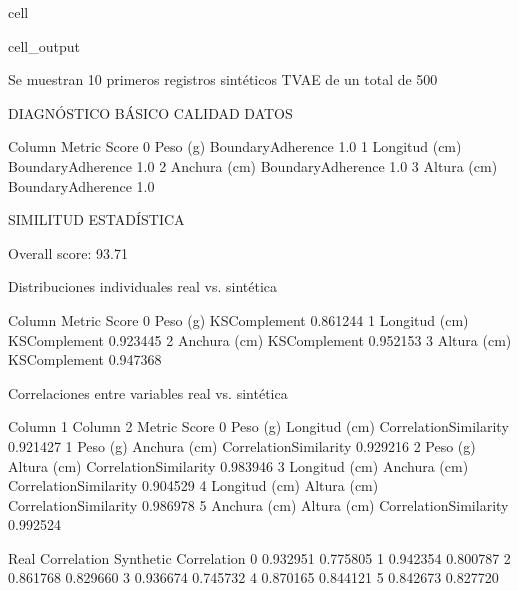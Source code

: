 \documentclass[a4paper,10pt,spanish]{jupyterBook}
\begin{document}
\begin{sphinxuseclass}{cell}
\begin{sphinxVerbatimOutput}
\begin{sphinxuseclass}{cell_output}
\begin{sphinxVerbatim}[commandchars=\\\{\}]
Se muestran 10 primeros registros sintéticos TVAE de un total de 500

DIAGNÓSTICO BÁSICO CALIDAD DATOS

          Column             Metric  Score
0       Peso (g)  BoundaryAdherence    1.0
1  Longitud (cm)  BoundaryAdherence    1.0
2   Anchura (cm)  BoundaryAdherence    1.0
3    Altura (cm)  BoundaryAdherence    1.0
\end{sphinxVerbatim}

\noindent{}

\begin{sphinxVerbatim}[commandchars=\\\{\}]
SIMILITUD ESTADÍSTICA

Overall score: 93.71\PYGZpc{}


 Distribuciones individuales real vs. sintética

          Column        Metric     Score
0       Peso (g)  KSComplement  0.861244
1  Longitud (cm)  KSComplement  0.923445
2   Anchura (cm)  KSComplement  0.952153
3    Altura (cm)  KSComplement  0.947368

 Correlaciones entre variables real vs. sintética

        Column 1       Column 2                 Metric     Score  \PYGZbs{}
0       Peso (g)  Longitud (cm)  CorrelationSimilarity  0.921427
1       Peso (g)   Anchura (cm)  CorrelationSimilarity  0.929216
2       Peso (g)    Altura (cm)  CorrelationSimilarity  0.983946
3  Longitud (cm)   Anchura (cm)  CorrelationSimilarity  0.904529
4  Longitud (cm)    Altura (cm)  CorrelationSimilarity  0.986978
5   Anchura (cm)    Altura (cm)  CorrelationSimilarity  0.992524

   Real Correlation  Synthetic Correlation
0          0.932951               0.775805
1          0.942354               0.800787
2          0.861768               0.829660
3          0.936674               0.745732
4          0.870165               0.844121
5          0.842673               0.827720
\end{sphinxVerbatim}

\end{sphinxuseclass}\end{sphinxVerbatimOutput}

\end{sphinxuseclass}
\sphinxAtStartPar
\end{document}
